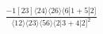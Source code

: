 \documentclass[varwidth, border=5pt]{standalone}
\begin{document}
\begin{my}
$\begin{gathered}
\scriptscriptstyle\frac{-1[23]⟨24⟩⟨26⟩⟨6|1+5|2]}{⟨12⟩⟨23⟩⟨56⟩⟨2|3+4|2]^2}
\end{gathered}$
\end{my}
\end{document}
